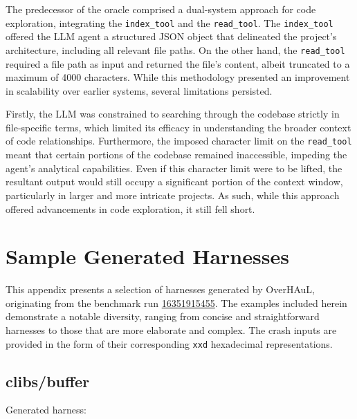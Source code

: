 \documentclass[
  a4paper,
]{scrreprt}
\theoremstyle{definition}
\theoremstyle{remark}
\begin{document}
\begin{enumerate}
  The predecessor of the oracle comprised a dual-system approach for
  code exploration, integrating the \texttt{index\_tool} and the
  \texttt{read\_tool}. The \texttt{index\_tool} offered the LLM agent a
  structured JSON object that delineated the project's architecture,
  including all relevant file paths. On the other hand, the
  \texttt{read\_tool} required a file path as input and returned the
  file's content, albeit truncated to a maximum of 4000 characters.
  While this methodology presented an improvement in scalability over
  earlier systems, several limitations persisted.

  Firstly, the LLM was constrained to searching through the codebase
  strictly in file-specific terms, which limited its efficacy in
  understanding the broader context of code relationships. Furthermore,
  the imposed character limit on the \texttt{read\_tool} meant that
  certain portions of the codebase remained inaccessible, impeding the
  agent's analytical capabilities. Even if this character limit were to
  be lifted, the resultant output would still occupy a significant
  portion of the context window, particularly in larger and more
  intricate projects. As such, while this approach offered advancements
  in code exploration, it still fell short.
\end{enumerate}

\chapter{Sample Generated Harnesses}\label{sec-sample-harnesses}

This appendix presents a selection of harnesses generated by OverHAuL,
originating from the benchmark run
\href{https://github.com/kchousos/OverHAuL/actions/runs/16351915455}{16351915455}.
The examples included herein demonstrate a notable diversity, ranging
from concise and straightforward harnesses to those that are more
elaborate and complex. The crash inputs are provided in the form of
their corresponding \texttt{xxd} hexadecimal representations.

\section{clibs/buffer}\label{clibsbuffer}

Generated harness:
\end{document}
